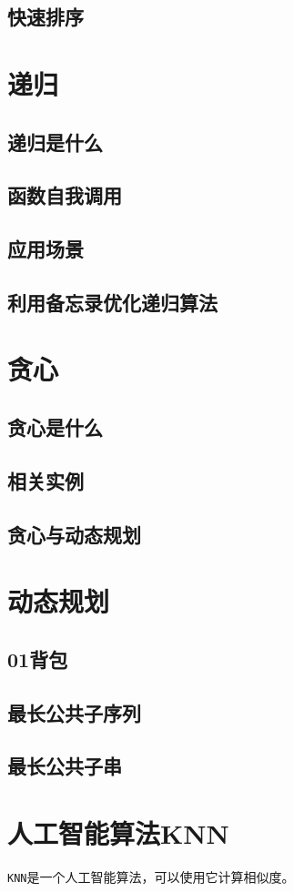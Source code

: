 \documentclass{book}
\begin{document}
\section{快速排序}
\chapter{递归}
\section{递归是什么}
\section{函数自我调用}
\section{应用场景}
\section{利用备忘录优化递归算法}
\chapter{贪心}
\section{贪心是什么}
\section{相关实例}
\section{贪心与动态规划}
\chapter{动态规划}
\section{01背包}
\section{最长公共子序列}
\section{最长公共子串}
\chapter{人工智能算法KNN}
\indent \verb|KNN|是一个人工智能算法，可以使用它计算相似度。
\end{document}
